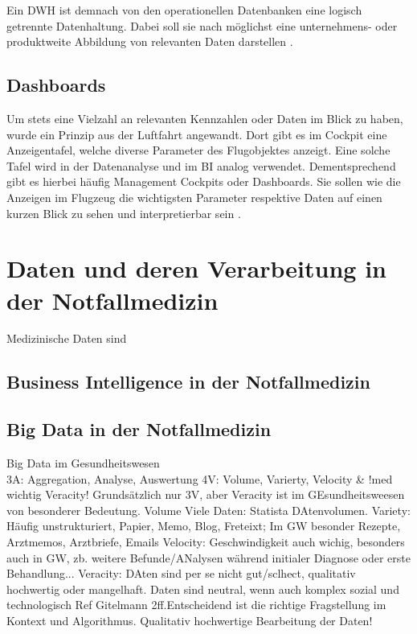 Ein \gls{DWH} ist demnach von den operationellen Datenbanken eine logisch getrennte Datenhaltung.
Dabei soll sie nach \cite[S.6]{MuckschBehme.2000} möglichst eine unternehmens- oder produktweite Abbildung von relevanten Daten darstellen \cite{Kemper.2001}.

\cite[S.7]{Gabriel.2011}


\subsection{Dashboards}
Um stets eine Vielzahl an relevanten Kennzahlen oder Daten im Blick zu haben, wurde ein Prinzip aus der Luftfahrt angewandt.
Dort gibt es im Cockpit eine Anzeigentafel, welche diverse Parameter des Flugobjektes anzeigt.
Eine solche Tafel wird in der Datenanalyse und im \gls{BI} analog verwendet.
Dementsprechend gibt es hierbei häufig \glqq Management Cockpits\grqq{} oder \glqq Dashboards\grqq.
Sie sollen wie die Anzeigen im Flugzeug die wichtigsten Parameter respektive Daten auf einen kurzen Blick zu sehen und interpretierbar sein \cite[S.18]{Engels.2015}.


\section{Daten und deren Verarbeitung in der Notfallmedizin} %
Medizinische Daten sind
\subsection{Business Intelligence in der Notfallmedizin}

\subsection{Big Data in der Notfallmedizin}

Big Data im Gesundheitswesen\\

3A: Aggregation, Analyse, Auswertung
4V: Volume, Varierty, Velocity \& !med wichtig Veracity! 
Grundsätzlich nur 3V, aber Veracity ist im GEsundheitsweesen von besonderer Bedeutung. 
Volume Viele Daten: Statista DAtenvolumen.
Variety: Häufig unstrukturiert, Papier, Memo, Blog, Freteixt; Im GW besonder Rezepte, Arztmemos, Arztbriefe, Emails
Velocity: Geschwindigkeit auch wichig, besonders auch in GW, zb. weitere Befunde/ANalysen während initialer Diagnose oder erste Behandlung...
Veracity: DAten sind per se nicht gut/sclhect, qualitativ hochwertig oder mangelhaft. Daten sind neutral, wenn auch komplex sozial und technologisch Ref Gitelmann 2ff.Entscheidend ist die richtige Fragstellung im Kontext und Algorithmus. Qualitativ hochwertige Bearbeitung der Daten! \\

